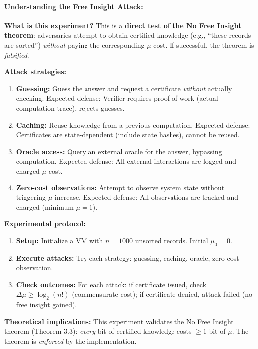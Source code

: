 \paragraph{Understanding the Free Insight Attack:}

\textbf{What is this experiment?} This is a \textbf{direct test of the No Free Insight theorem}: adversaries attempt to obtain certified knowledge (e.g., ``these records are sorted'') \textit{without} paying the corresponding $\mu$-cost. If successful, the theorem is \textit{falsified}.

\textbf{Attack strategies:}
\begin{enumerate}
    \item \textbf{Guessing:} Guess the answer and request a certificate \textit{without} actually checking. Expected defense: Verifier requires proof-of-work (actual computation trace), rejects guesses.
    
    \item \textbf{Caching:} Reuse knowledge from a previous computation. Expected defense: Certificates are state-dependent (include state hashes), cannot be reused.
    
    \item \textbf{Oracle access:} Query an external oracle for the answer, bypassing computation. Expected defense: All external interactions are logged and charged $\mu$-cost.
    
    \item \textbf{Zero-cost observations:} Attempt to observe system state without triggering $\mu$-increase. Expected defense: All observations are tracked and charged (minimum $\mu = 1$).
\end{enumerate}

\textbf{Experimental protocol:}
\begin{enumerate}
    \item \textbf{Setup:} Initialize a VM with $n = 1000$ unsorted records. Initial $\mu_0 = 0$.
    
    \item \textbf{Execute attacks:} Try each strategy: guessing, caching, oracle, zero-cost observation.
    
    \item \textbf{Check outcomes:} For each attack: if certificate issued, check $\Delta\mu \geq \log_2(n!)$ (commensurate cost); if certificate denied, attack failed (no free insight gained).
\end{enumerate}

\textbf{Theoretical implications:} This experiment validates the No Free Insight theorem (Theorem 3.3): \textit{every} bit of certified knowledge costs $\geq 1$ bit of $\mu$. The theorem is \textit{enforced} by the implementation.


